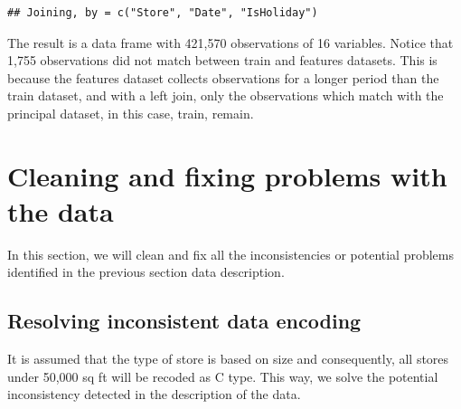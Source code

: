 \documentclass[11pt,]{article}
\newenvironment{Shaded}{\begin{snugshade}}{\end{snugshade}}
\newcommand{\DataTypeTok}[1]{\textcolor[rgb]{0.13,0.29,0.53}{{#1}}}
\newcommand{\DecValTok}[1]{\textcolor[rgb]{0.00,0.00,0.81}{{#1}}}
\newcommand{\StringTok}[1]{\textcolor[rgb]{0.31,0.60,0.02}{{#1}}}
\newcommand{\CommentTok}[1]{\textcolor[rgb]{0.56,0.35,0.01}{\textit{{#1}}}}
\newcommand{\NormalTok}[1]{{#1}}
\begin{document}
\begin{verbatim}
## Joining, by = c("Store", "Date", "IsHoliday")
\end{verbatim}

The result is a data frame with 421,570 observations of 16 variables.
Notice that 1,755 observations did not match between train and features
datasets. This is because the features dataset collects observations for
a longer period than the train dataset, and with a left join, only the
observations which match with the principal dataset, in this case,
train, remain.

\section{Cleaning and fixing problems with the
data}\label{cleaning-and-fixing-problems-with-the-data}

In this section, we will clean and fix all the inconsistencies or
potential problems identified in the previous section data description.

\subsection{Resolving inconsistent data
encoding}\label{resolving-inconsistent-data-encoding}

It is assumed that the type of store is based on size and consequently,
all stores under 50,000 sq ft will be recoded as C type. This way, we
solve the potential inconsistency detected in the description of the
data.

\begin{Shaded}
\end{Shaded}
\end{document}
